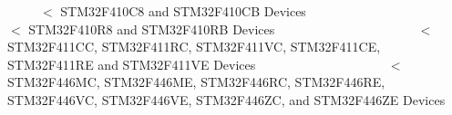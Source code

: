 ~\newline
~\newline
~\newline
 $<$ S\+T\+M32\+F410\+C8 and S\+T\+M32\+F410\+CB Devices ~\newline
~\newline
~\newline
~\newline
~\newline
~\newline
~\newline
~\newline
~\newline
~\newline
~\newline
~\newline
~\newline
~\newline
 $<$ S\+T\+M32\+F410\+R8 and S\+T\+M32\+F410\+RB Devices ~\newline
~\newline
~\newline
~\newline
~\newline
~\newline
~\newline
~\newline
~\newline
~\newline
~\newline
~\newline
~\newline
 $<$ S\+T\+M32\+F411\+CC, S\+T\+M32\+F411\+RC, S\+T\+M32\+F411\+VC, S\+T\+M32\+F411\+CE, S\+T\+M32\+F411\+RE and S\+T\+M32\+F411\+VE Devices ~\newline
~\newline
~\newline
~\newline
~\newline
~\newline
~\newline
~\newline
~\newline
~\newline
~\newline
~\newline
 $<$ S\+T\+M32\+F446\+MC, S\+T\+M32\+F446\+ME, S\+T\+M32\+F446\+RC, S\+T\+M32\+F446\+RE, S\+T\+M32\+F446\+VC, S\+T\+M32\+F446\+VE, S\+T\+M32\+F446\+ZC, and S\+T\+M32\+F446\+ZE Devices ~\newline
~\newline
